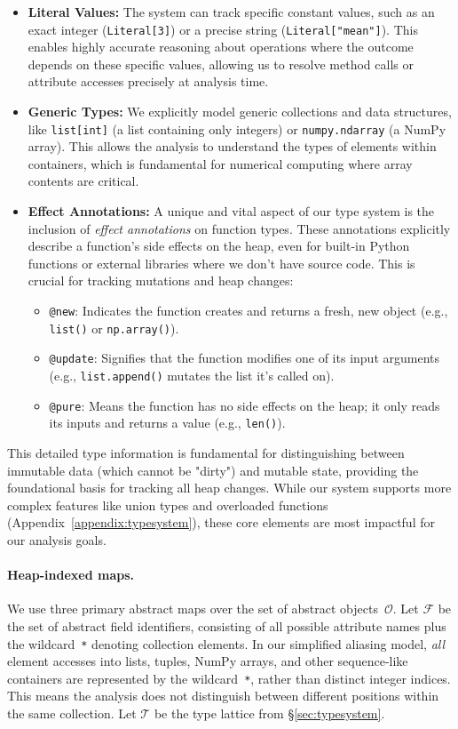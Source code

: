 \begin{itemize}
    \item \textbf{Literal Values:} The system can track specific constant values, such as an exact integer (\texttt{Literal[3]}) or a precise string (\texttt{Literal["mean"]}). This enables highly accurate reasoning about operations where the outcome depends on these specific values, allowing us to resolve method calls or attribute accesses precisely at analysis time.
    \item \textbf{Generic Types:} We explicitly model generic collections and data structures, like \texttt{list[int]} (a list containing only integers) or \texttt{numpy.ndarray} (a NumPy array). This allows the analysis to understand the types of elements within containers, which is fundamental for numerical computing where array contents are critical.
    \item \textbf{Effect Annotations:} A unique and vital aspect of our type system is the inclusion of \emph{effect annotations} on function types. These annotations explicitly describe a function's side effects on the heap, even for built-in Python functions or external libraries where we don't have source code. This is crucial for tracking mutations and heap changes:
    \begin{itemize}
        \item \texttt{@new}: Indicates the function creates and returns a fresh, new object (e.g., \texttt{list()} or \texttt{np.array()}).
        \item \texttt{@update}: Signifies that the function modifies one of its input arguments (e.g., \texttt{list.append()} mutates the list it's called on).
        \item \texttt{@pure}: Means the function has no side effects on the heap; it only reads its inputs and returns a value (e.g., \texttt{len()}).
    \end{itemize}
\end{itemize}
This detailed type information is fundamental for distinguishing between immutable data (which cannot be "dirty") and mutable state, providing the foundational basis for tracking all heap changes. While our system supports more complex features like union types and overloaded functions (Appendix~\ref{appendix:typesystem}), these core elements are most impactful for our analysis goals.

\paragraph{Heap-indexed maps.}
We use three primary abstract maps over the set of abstract objects~$\mathcal{O}$.
Let $\mathcal{F}$ be the set of abstract field identifiers, consisting of
all possible attribute names plus the wildcard~\texttt{*} denoting collection
elements. In our simplified aliasing model, \emph{all} element accesses
into lists, tuples, NumPy arrays, and other sequence-like containers are
represented by the wildcard~\texttt{*}, rather than distinct integer indices.
This means the analysis does not distinguish between different positions
within the same collection.
Let $\mathcal{T}$ be the type lattice from \S\ref{sec:typesystem}.

